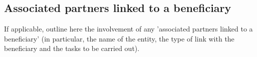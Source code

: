 \documentclass[12pt,draftproposal]{msca-pf}
\begin{document}
\subsection*{Associated partners linked to a beneficiary {\protect\footnotemark{}}}
\label{ssc:implementation:partners}

\begin{mscaexplanation}
If applicable, outline here the involvement of any 'associated partners linked
to a beneficiary' (in particular, the name of the entity, the type of link with
the beneficiary and the tasks to be carried out).

\end{mscaexplanation}
\end{document}
